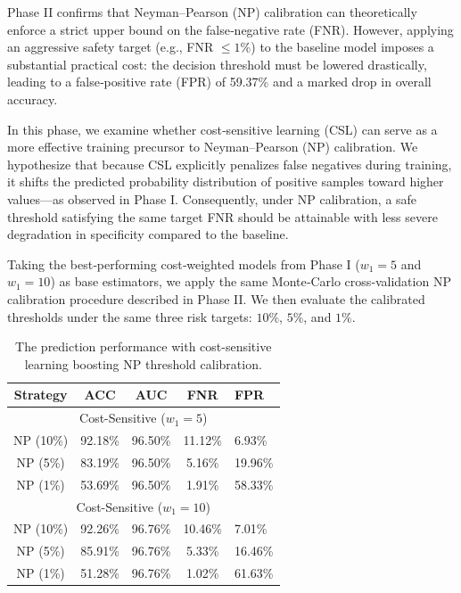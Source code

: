 \documentclass[journal]{IEEEtran}
\theoremstyle{remark}
\begin{document}
Phase II confirms that Neyman–Pearson (NP) calibration can theoretically enforce a strict upper bound on the false‑negative rate (FNR). However, applying an aggressive safety target (e.g., FNR $\leq 1\%$) to the baseline model imposes a substantial practical cost: the decision threshold must be lowered drastically, leading to a false‑positive rate (FPR) of 59.37\% and a marked drop in overall accuracy.

In this phase, we examine whether cost‑sensitive learning (CSL) can serve as a more effective training precursor to Neyman–Pearson (NP) calibration. We hypothesize that because CSL explicitly penalizes false negatives during training, it shifts the predicted probability distribution of positive samples toward higher values—as observed in Phase I. Consequently, under NP calibration, a safe threshold satisfying the same target FNR should be attainable with less severe degradation in specificity compared to the baseline.

Taking the best‑performing cost‑weighted models from Phase I (\(w_{1}=5\) and \(w_{1}=10\)) as base estimators, we apply the same Monte‑Carlo cross‑validation NP calibration procedure described in Phase II. We then evaluate the calibrated thresholds under the same three risk targets: \(10\%\), \(5\%\), and \(1\%\).


\begin{table}[htbp]
    \centering
    \caption{The prediction performance with cost-sensitive learning boosting NP threshold calibration.}
    \label{tab:csl_np_results}
    \begin{tabular}{ccccl}
        \toprule
        Strategy & ACC & AUC & FNR & FPR \\
        \midrule
        \multicolumn{5}{c}{Cost-Sensitive ($w_1=5$)} \\
        \midrule
         NP (10\%) & 92.18\% & 96.50\% & 11.12\% & 6.93\% \\
         NP (5\%)  & 83.19\% & 96.50\% & 5.16\%  & 19.96\% \\
         NP (1\%)  & 53.69\% & 96.50\% & 1.91\%  & 58.33\% \\
        \midrule
        \multicolumn{5}{c}{Cost-Sensitive ($w_1=10$)} \\
        \midrule
         NP (10\%) & 92.26\% & 96.76\% & 10.46\% & 7.01\% \\
         NP (5\%)  & 85.91\% & 96.76\% & 5.33\%  & 16.46\% \\
         NP (1\%)  & 51.28\% & 96.76\% & 1.02\%  & 61.63\% \\
        \bottomrule
    \end{tabular}
    \vskip -0.1in
\end{table}
\end{document}
